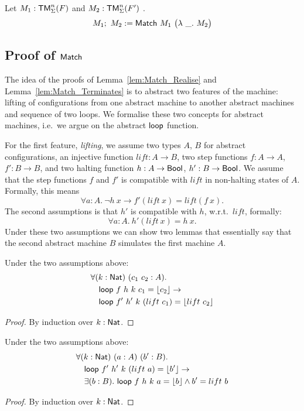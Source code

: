 \begin{definition}
  Let $M_1 : \textsf{TM}_\Sigma^n(F)$ and $M_2 : \textsf{TM}_\Sigma^n(F')$ .
  \[
    M_1 ;~ M_2 := \textsf{Match}~M_1~
    \bigl(
    \lambda~\_.~M_2
    \bigr)
  \]
\end{definition}


\subsection{Proof of $\textsf{Match}$}
\label{sec:match-proofs}

The idea of the proofs of Lemma~\ref{lem:Match_Realise} and Lemma~\ref{lem:Match_Terminates} is to abstract two features of the machine: lifting of
configurations from one abstract machine to another abstract machines and sequence of two loops.  We formalise these two concepts for abstract
machines, i.e.\ we argue on the abstract $\textsf{loop}$ function.

For the first feature, \emph{lifting}, we assume two types $A$, $B$ for abstract configurations, an injective function $lift : A \to B$, two step
functions $f : A \to A$, $f' : B \to B$, and two halting function $h : A \rightarrow \textsf{Bool}$, $h' : B \rightarrow \textsf{Bool}$.  We assume that the step functions $f$ and
$f'$ is compatible with $lift$ in non-halting states of $A$.  Formally, this means
\[ \forall a:A.~\lnot h~x \rightarrow f' (lift~x) = lift (f~x). \]
The second assumptions is that $h'$ is compatible with $h$, w.r.t.\ $lift$, formally:
\[ \forall a:A.~h'(lift~x)=h~x. \]
Under these two assumptions we can show two lemmas that essentially say that the second abstract machine $B$ simulates the first machine $A$.
\begin{lemma}
  \label{lem:loop_lift}
  Under the two assumptions above:
  \begin{alignat*}{1}
    & \forall (k:\textsf{Nat})~(c_1~c_2 : A). \\
    & \quad \textsf{loop}~f ~h ~k~c_1 = \left\lfloor {c_2} \right\rfloor \rightarrow \\
    & \quad \textsf{loop}~f'~h'~k~(lift~c_1) = \left\lfloor {lift~c_2} \right\rfloor
  \end{alignat*}
\end{lemma}
\begin{proof}
  By induction over $k:\textsf{Nat}$.
\end{proof}
\begin{lemma}
  \label{lem:loop_unlift}
  Under the two assumptions above:
  \begin{alignat*}{1}
    & \forall (k:\textsf{Nat})~(a:A)~(b':B). \\
    & \quad \textsf{loop}~f'~h'~k~(lift~a) = \left\lfloor {b'} \right\rfloor \rightarrow \\
    & \quad \exists (b:B).~\textsf{loop}~f~h~k~a = \left\lfloor {b} \right\rfloor \land b'=lift~b
  \end{alignat*}
\end{lemma}
\begin{proof}
  By induction over $k:\textsf{Nat}$.
\end{proof}

